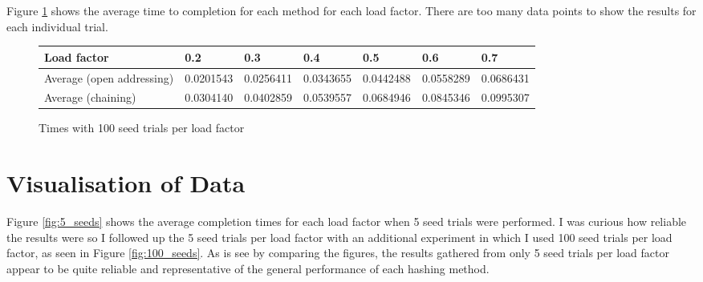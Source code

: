 \documentclass{article}
\begin{document}
Figure \ref{tab:100_seeds} shows the average time to completion for each method for each load factor.  There are too many data points to show the results for each individual trial.

\begin{figure}[H]
\centering
\begin{tabular}{|l|llllll|}\hline
Load factor               & 0.2       & 0.3       & 0.4       & 0.5       & 0.6       & 0.7       \\ \hline
Average (open addressing) & 0.0201543 & 0.0256411 & 0.0343655 & 0.0442488 & 0.0558289 & 0.0686431 \\
Average (chaining)        & 0.0304140 & 0.0402859 & 0.0539557 & 0.0684946 & 0.0845346 & 0.0995307 \\ \hline
\end{tabular}
\caption{Times with 100 seed trials per load factor}
\label{tab:100_seeds}
\end{figure}




\section{Visualisation of Data}

Figure \ref{fig:5_seeds} shows the average completion times for each load factor when 5 seed trials were performed.  I was curious how reliable the results were so I followed up the 5 seed trials per load factor with an additional experiment in which I used 100 seed trials per load factor, as seen in Figure \ref{fig:100_seeds}.  As is see by comparing the figures, the results gathered from only 5 seed trials per load factor appear to be quite reliable and representative of the general performance of each hashing method.
\end{document}

